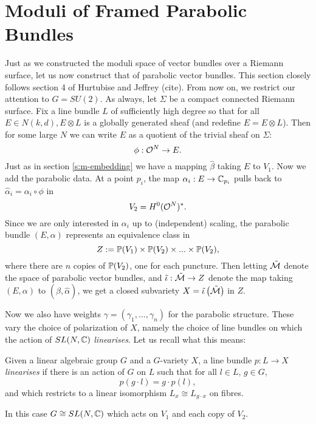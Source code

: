 	\section{Moduli of Framed Parabolic Bundles}
	Just as we constructed the moduli space of vector bundles over a Riemann surface, let us now construct that of parabolic vector bundles. This section closely follows section 4 of Hurtubise and Jeffrey (cite). From now on, we restrict our attention to $G=SU(2)$. As always, let $\Sigma$ be a compact connected Riemann surface. Fix a line bundle $L$ of sufficiently high degree so that for all $E\in N(k,d), E\otimes L$ is a globally generated sheaf (and redefine $E = E\otimes L$). Then for some large $N$ we can write $E$ as a quotient of the trivial sheaf on $\Sigma$:
	\begin{equation}
		\phi: \mathcal{O}^N \to E.
	\end{equation}
	Just as in section \ref{s:m-embedding} we have a mapping $\hat{\beta}$ taking $E$ to $V_1$. Now we add the parabolic data. At a point $p_i$, the map $\alpha_i:E\to \mathbb{C}_{p_i}$ pulls back to $\hat{\alpha}_i = \alpha_i\circ \phi$ in 
	\begin{equation}
		V_2 = H^0(\mathcal{O}^N)^\ast.
	\end{equation}
	Since we are only interested in $\alpha_i$ up to (independent) scaling, the parabolic bundle $(E,\alpha)$ represents an equivalence class in
	\begin{equation}
		Z := \mathbb{P}(V_1) \times \mathbb{P}(V_2) \times ... \times \mathbb{P}(V_2),
	\end{equation}
	where there are $n$ copies of $\mathbb{P}(V_2)$, one for each puncture. Then letting $\tilde{\mathcal{M}}$ denote the space of parabolic vector bundles, and $\tilde{\iota}:\tilde{\mathcal{M}}\to Z$ denote the map taking $(E,\alpha)$ to $(\hat{\beta},\hat{\alpha})$, we get a closed subvariety $X = \tilde{\iota}\left(\tilde{\mathcal{M}}\right)$ in $Z$. 

	Now we also have weights $\gamma = (\gamma_1,...,\gamma_n)$ for the parabolic structure. These vary the choice of polarization of $X$, namely the choice of line bundles on which the action of $SL(N,\mathbb{C})$ \textit{linearises}. Let us recall what this means:
	\begin{definition}
		Given a linear algebraic group $G$ and a $G$-variety $X$, a line bundle $p:L\to X$ \emph{linearises} if there is an action of $G$ on $L$ such that for all $l\in L$, $g\in G$,
		\begin{equation}
			p(g\cdot l) = g\cdot p(l),
		\end{equation}
		and which restricts to a linear isomorphism $L_x \cong L_{g\cdot x}$ on fibres.
	\end{definition}
	In this case $G\cong SL(N,\mathbb{C})$ which acts on $V_1$ and each copy of $V_2$.
	
